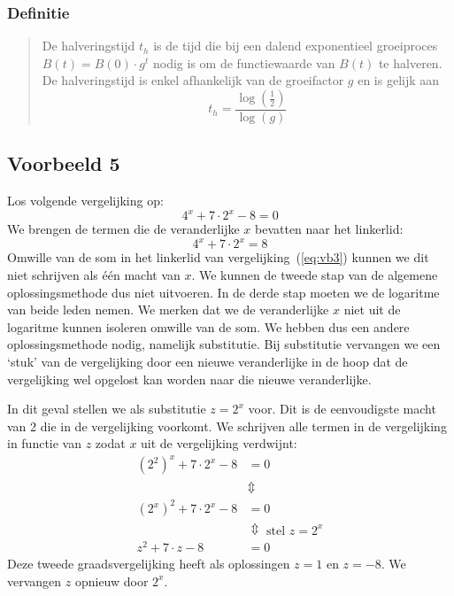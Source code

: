  \subsubsection{Definitie}
 \begin{quote}
 De halveringstijd $t_h$ is de tijd die bij een dalend exponentieel groeiproces $B(t)=B(0)\cdot g^t$ nodig is  om  de functiewaarde van $B(t)$ te halveren.
 De halveringstijd is enkel afhankelijk van de groeifactor $g$ en is gelijk aan 
 \begin{displaymath}
     t_{h}=\frac{\log(\frac{1}{2})}{\log(g)}
 \end{displaymath} 
 \end{quote}


\subsection{Voorbeeld 5}

Los volgende vergelijking op:
\begin{equation}
    4^{x}+7\cdot 2^{x}-8=0
\label{eq:vb3}
\end{equation}
We brengen de termen die de veranderlijke $x$ bevatten naar het linkerlid:
\begin{equation*}
4^x+7\cdot 2^x=8
\end{equation*}
Omwille van de som in het linkerlid van vergelijking~(\ref{eq:vb3}) kunnen we dit niet schrijven als \'e\'en macht van $x$. We kunnen de tweede stap van de algemene oplossingsmethode dus niet uitvoeren. In de derde stap moeten we de logaritme van beide leden nemen. We merken dat we de veranderlijke $x$ niet uit de logaritme kunnen isoleren omwille van de som. We hebben dus een andere oplossingsmethode nodig, namelijk substitutie. Bij substitutie vervangen we een `stuk' van de vergelijking door een nieuwe veranderlijke in de hoop dat de vergelijking wel opgelost kan worden naar die nieuwe veranderlijke. 

In dit geval stellen we als substitutie $z=2^x$ voor.
Dit is de eenvoudigste
macht van 2 die in de vergelijking voorkomt.
We schrijven alle termen in de vergelijking in functie van $z$
zodat $x$ uit de vergelijking verdwijnt:
\begin{align*}
    \left(2^{2}\right)^{x}+7\cdot2^{x}-8 &= 0  \\
     &\Updownarrow  \\
    \left(2^{x}\right)^{2}+7\cdot2^{x}-8 &=  0  \\
     &\Updownarrow \text{ stel } z=2^x \\
    z^{2}+7\cdot z-8 &= 0
\end{align*}
Deze tweede graadsvergelijking heeft als oplossingen $z=1$ en $z=-8$.
We vervangen $z$ opnieuw door $2^{x}$. 

